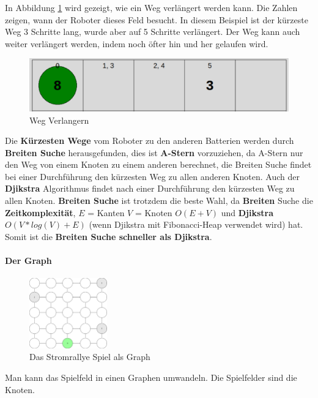 \documentclass[a4paper,12pt,arial]{scrartcl}
\begin{document}
In Abbildung \ref{fig:weg_verlangern} wird gezeigt, wie ein Weg verlängert werden kann. Die Zahlen zeigen, wann der Roboter dieses Feld besucht. In diesem Beispiel ist der kürzeste Weg 3 Schritte lang, wurde aber auf 5 Schritte verlängert. Der Weg kann auch weiter verlängert werden, indem noch öfter hin und her gelaufen wird.
\begin{figure}[h]
    \centering
    \includegraphics[height=0.09\textheight]{weg_verlaengern_n.pdf}
    \caption{Weg Verlangern}
    \label{fig:weg_verlangern}
\end{figure}
\par
Die \textbf{Kürzesten Wege} vom Roboter zu den anderen Batterien werden durch \textbf{Breiten Suche} \cite{cormen} herausgefunden, dies ist \textbf{A-Stern} \cite{hart} vorzuziehen, da A-Stern nur den Weg von einem Knoten zu einem anderen berechnet, die Breiten Suche findet bei einer Durchführung den kürzesten Weg zu allen anderen Knoten. Auch der \textbf{Djikstra} \cite{dijkstra} Algorithmus findet nach einer Durchführung den kürzesten Weg zu allen Knoten. \textbf{Breiten Suche} ist trotzdem die beste Wahl, da \textbf{Breiten} Suche die \textbf{Zeitkomplexität}, $E$ = Kanten $V$ = Knoten $O(E + V)$ und \textbf{Djikstra} $O(V * log(V) + E)$ (wenn Djikstra mit Fibonacci-Heap verwendet wird) hat. Somit ist die \textbf{Breiten Suche schneller als Djikstra}.

\paragraph{Der Graph}
\captionsetup[figure]{name=Abb.}
\begin{figure}
    \includegraphics[width=0.3\textwidth]{graph_stromrallye.pdf}
    \caption{Das Stromrallye Spiel als Graph}
    \label{fig:graph_stromrallye}
    \vspace{-5pt}
\end{figure}
\captionsetup[figure]{name=Abbildung}
Man kann das Spielfeld in einen Graphen umwandeln. Die Spielfelder sind die Knoten.
\end{document}
